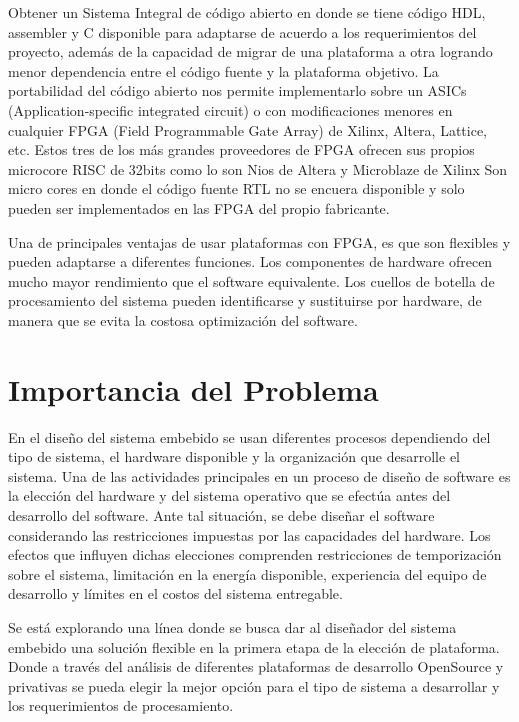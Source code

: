 Obtener un Sistema Integral de código abierto en donde se tiene código HDL, assembler y C disponible para adaptarse de acuerdo a los requerimientos
del proyecto, además de la capacidad de migrar de una plataforma a otra logrando menor dependencia entre el código fuente y la plataforma
objetivo. La portabilidad del código abierto nos permite implementarlo sobre un ASICs (Application-specific integrated circuit) o con modificaciones
menores en cualquier FPGA (Field Programmable Gate Array) de Xilinx, Altera, Lattice, etc. Estos tres de los más grandes proveedores de FPGA  %
ofrecen sus propios microcore RISC de 32bits como lo son Nios de  Altera y Microblaze de Xilinx  Son micro cores en donde el código fuente RTL no se
encuera disponible y solo pueden ser implementados en las FPGA del propio fabricante.

Una de principales ventajas de usar plataformas con FPGA, es que son flexibles y pueden adaptarse a diferentes funciones. Los componentes de
hardware ofrecen mucho mayor rendimiento que el software equivalente. Los cuellos de botella de procesamiento del sistema pueden identificarse y
sustituirse por hardware, de manera que se evita la costosa optimización del software.

\section{Importancia del Problema}


En el diseño del sistema embebido se usan diferentes procesos dependiendo del tipo de sistema, el hardware disponible y la organización que
desarrolle el sistema. Una de las actividades principales en un proceso de diseño de software es la elección del hardware y del sistema operativo que
se efectúa antes del desarrollo del software. Ante tal situación, se debe diseñar el software considerando las restricciones impuestas por las
capacidades del hardware.
Los efectos que influyen dichas elecciones comprenden restricciones de temporización sobre el sistema, limitación en la energía disponible,
experiencia del equipo de desarrollo y límites en el costos del sistema entregable.
 
Se está explorando una línea donde se busca dar al diseñador del sistema embebido una solución flexible en la primera etapa de la elección de
plataforma. Donde a través del análisis de diferentes plataformas de desarrollo OpenSource y privativas se pueda elegir la mejor opción para el tipo
de sistema a desarrollar y los requerimientos de procesamiento.

